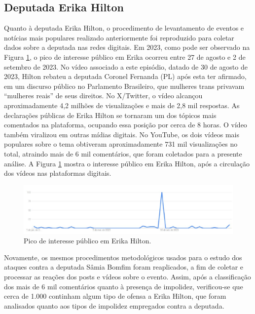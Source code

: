 \documentclass[portuguese]{textolivre}
\begin{document}
\subsection{Deputada Erika Hilton}\label{sec-3.2}

Quanto à deputada Erika Hilton, o procedimento de levantamento de eventos e notícias mais populares realizado anteriormente foi reproduzido para coletar dados sobre a deputada nas redes digitais. Em 2023, como pode ser observado na Figura \ref{graf-3}, o pico de interesse público em Erika ocorreu entre 27 de agosto e 2 de setembro de 2023. No vídeo associado a este episódio, datado de 30 de agosto de 2023, Hilton rebateu a deputada Coronel Fernanda (PL) após esta ter afirmado, em um discurso público no Parlamento Brasileiro, que mulheres trans privavam ``mulheres reais'' de seus direitos. No X/Twitter, o vídeo alcançou aproximadamente 4,2 milhões de visualizações e mais de 2,8 mil respostas. As declarações públicas de Erika Hilton se tornaram um dos tópicos mais comentados na plataforma, ocupando essa posição por cerca de 8 horas. O vídeo também viralizou em outras mídias digitais. No YouTube, os dois vídeos mais populares sobre o tema obtiveram aproximadamente 731 mil visualizações no total, atraindo mais de 6 mil comentários, que foram coletados para a presente análise. A Figura \ref{graf-3} mostra o interesse público em Erika Hilton, após a circulação dos vídeos nas plataformas digitais.

\begin{figure}[h!]
\centering
\begin{minipage}{.90\textwidth}
\includegraphics[width =\textwidth]{Fig4.png}
\caption{Pico de interesse público em Erika Hilton.}
\label{graf-3}
\end{minipage}
\end{figure}

Novamente, os mesmos procedimentos metodológicos usados para o estudo dos ataques contra a deputada Sâmia Bomfim foram reaplicados, a fim de coletar e processar as reações dos posts e vídeos sobre o evento. Assim, após a classificação dos mais de 6 mil comentários quanto à presença de impolidez, verificou-se que cerca de 1.000 continham algum tipo de ofensa a Erika Hilton, que foram analisados quanto aos tipos de impolidez empregados contra a deputada.
\end{document}
